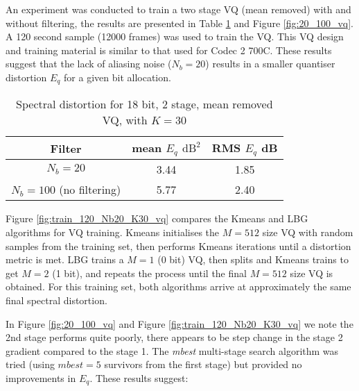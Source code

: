 \documentclass{article}
\begin{document}
An experiment was conducted to train a two stage VQ (mean removed) with and without filtering, the results are presented in Table \ref{table:ratek2_vq} and Figure \ref{fig:20_100_vq}.  A 120 second sample (12000 frames) was used to train the VQ. This VQ design and training material is similar to that used for Codec 2 700C.  These results suggest that the lack of aliasing noise ($N_b=20$) results in a smaller quantiser distortion $E_q$ for a given bit allocation.

\begin{table}[h]
\centering
\begin{tabular}{c c c}
 \hline
 Filter & mean $E_q$ $\textrm{dB}^2$ & RMS $E_q$ dB \\
 \hline
 $N_b=20$ & 3.44 & 1.85 \\ 
 $N_b=100$ (no filtering) & 5.77 & 2.40 \\
 \hline
\end{tabular}
\caption{Spectral distortion for 18 bit, 2 stage, mean removed VQ, with $K=30$}
\label{table:ratek2_vq}
\end{table}

Figure \ref{fig:train_120_Nb20_K30_vq} compares the Kmeans and LBG algorithms for VQ training.  Kmeans initialises the $M=512$ size VQ with random samples from the training set, then performs Kmeans iterations until a distortion metric is met. LBG trains a $M=1$ (0 bit) VQ, then splits and Kmeans trains to get $M=2$ (1 bit), and repeats the process until the final $M=512$ size VQ is obtained.  For this training set, both algorithms arrive at approximately the same final spectral distortion.

In Figure \ref{fig:20_100_vq} and Figure \ref{fig:train_120_Nb20_K30_vq} we note the 2nd stage performs quite poorly, there appears to be step change in the stage 2 gradient compared to the stage 1.  The \emph{mbest} multi-stage search algorithm was tried  (using $mbest=5$ survivors from the first stage) but provided no improvements in $E_q$. These results suggest:
\end{document}
